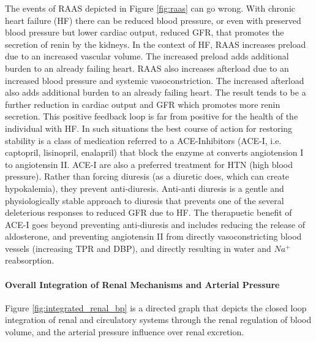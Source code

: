 The events of RAAS depicted in Figure \ref{fig:raas} can go wrong. With chronic heart failure (HF) there can be reduced blood pressure, or even with preserved blood pressure but lower cardiac output, reduced GFR, that promotes the secretion of renin by the kidneys. In the context of HF, RAAS increases preload due to an increased vascular volume. The increased preload adds additional burden to an already failing heart. RAAS also increases afterload due to an increased blood pressure and systemic vasoconstriction. The increased afterload also adds additional burden to an already failing heart. The result tends to be a further reduction in cardiac output and GFR which promotes more renin secretion. This positive feedback loop is far from positive for the health of the individual with HF. In such situations the best course of action for restoring stability is a class of medication referred to a ACE-Inhibitors (ACE-I, i.e. captopril, lisinopril, enalapril) that block the enzyme at converts angiotension I to angiotensin II. ACE-I are also a preferred treatment for HTN (high blood pressure). Rather than forcing diuresis (as a diuretic does, which can create hypokalemia), they prevent anti-diuresis. Anti-anti diuresis is a gentle and physiologically stable approach to diuresis that prevents one of the several deleterious responses to reduced GFR due to HF. The therapuetic benefit of ACE-I goes beyond preventing anti-diuresis and includes reducing the release of aldosterone, and preventing angiotensin II from directly vasoconstricting blood vessels (increasing TPR and DBP), and directly resulting in water and $Na^+$ reabsorption.

\paragraph{Overall Integration of Renal Mechanisms and Arterial Pressure}

Figure \ref{fig:integrated_renal_bp} is a directed graph that depicts the closed loop integration of renal and circulatory systems through the renal regulation of blood volume, and the arterial pressure influence over renal excretion. 

